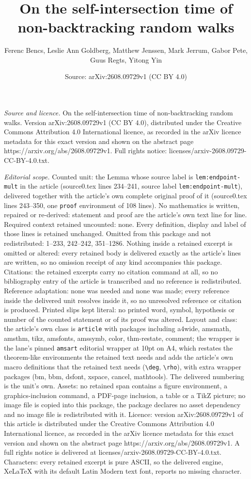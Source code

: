 \documentclass[10pt,a4paper]{amsart}
\title[On the self-intersection time of non-backtracking random wal]{On the self-intersection time of non-backtracking random walks}
\author{Ferenc Bencs, Leslie Ann Goldberg, Matthew Jenssen, Mark Jerrum, Gabor Pete, Guus Regts, Yitong Yin}
\date{Source: arXiv:2608.09729v1 (CC BY 4.0)}
\begin{document}
\maketitle

\noindent\emph{Source and licence.} On the self-intersection time of non-backtracking random walks. Version arXiv:2608.09729v1 (CC BY 4.0), distributed under the Creative Commons Attribution 4.0 International licence, as recorded in the arXiv licence metadata for this exact version and shown on the abstract page https://arxiv.org/abs/2608.09729v1. Full rights notice: licenses/arxiv-2608.09729-CC-BY-4.0.txt.\par\smallskip

\noindent\textit{Editorial scope.} Counted unit: the Lemma whose source label is \texttt{lem:endpoint-mult} in the article (source0.tex lines 234--241, source label \texttt{lem:endpoint-mult}), delivered together with the article's own complete original proof of it (source0.tex lines 243--350, one \texttt{proof} environment of 108 lines). No mathematics is written, repaired or re-derived: statement and proof are the article's own text line for line. Required context retained uncounted: none. Every definition, display and label of those lines is retained unchanged. Omitted from this package and not redistributed: 1--233, 242--242, 351--1286. Nothing inside a retained excerpt is omitted or altered: every retained body is delivered exactly as the article's lines are written, so no omission receipt of any kind accompanies this package. Citations: the retained excerpts carry no citation command at all, so no bibliography entry of the article is transcribed and no reference is redistributed. Reference adaptation: none was needed and none was made; every reference inside the delivered unit resolves inside it, so no unresolved reference or citation is produced. Printed slips kept literal: no printed word, symbol, hypothesis or number of the counted statement or of its proof was altered. Layout and class: the article's own class is \texttt{article} with packages including a4wide, amsmath, amsthm, tikz, amsfonts, amssymb, color, thm-restate, comment; the wrapper is the lane's pinned \texttt{amsart} editorial wrapper at 10pt on A4, which restates the theorem-like environments the retained text needs and adds the article's own macro definitions that the retained text needs (\texttt{\textbackslash deg}, \texttt{\textbackslash rho}), with extra wrapper packages (bm, bbm, dsfont, xspace, cancel, mathtools). The delivered numbering is the unit's own. Assets: no retained span contains a figure environment, a graphics-inclusion command, a PDF-page inclusion, a table or a TikZ picture; no image file is copied into this package, the package declares no asset dependency and no image file is redistributed with it. Licence: version arXiv:2608.09729v1 of this article is distributed under the Creative Commons Attribution 4.0 International licence, as recorded in the arXiv licence metadata for this exact version and shown on the abstract page https://arxiv.org/abs/2608.09729v1. A full rights notice is delivered at licenses/arxiv-2608.09729-CC-BY-4.0.txt. Characters: every retained excerpt is pure ASCII, so the delivered engine, XeLaTeX with its default Latin Modern text font, reports no missing character.
\end{document}
